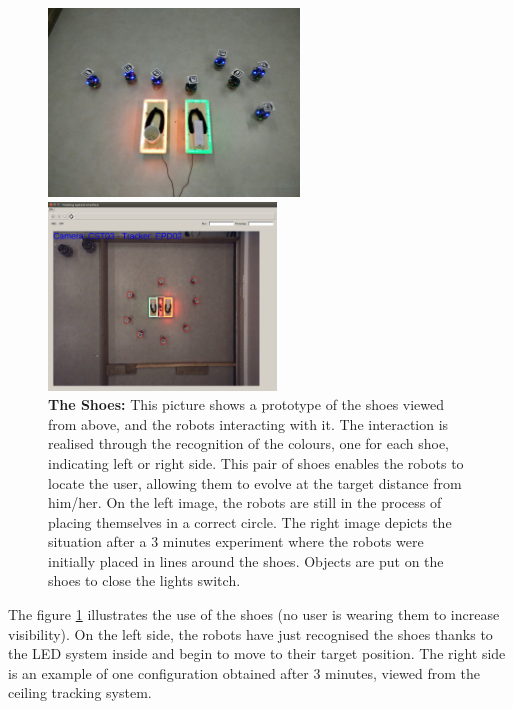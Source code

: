 \documentclass[oneside, a4paper, 12pt]{memoir}
\let\oldCaption\caption
\renewcommand{\caption}[2]{
\oldCaption[#1]{{\small\sffamily\bfseries #1:} #2}
}
\begin{document}
	\begin{figure}
		\begin{minipage}[c]{0.6\textwidth}
			\includegraphics[trim=200px 300px 140px 300px, clip=true, height=5cm]{images/shoes.jpg}
		\end{minipage}
		\hfill
		\begin{minipage}[c]{0.39\textwidth}
			\hfill\includegraphics[trim=380px 230px 380px 360px, clip=true, height=5cm]{../Experiments/No_Human/6end.png}
		\end{minipage}				
		
		\caption{The Shoes}{This picture shows a prototype of the shoes viewed from above, and the robots interacting with it. The interaction is realised through the recognition of the colours, one for each shoe, indicating left or right side. This pair of shoes enables the robots to locate the user, allowing them to evolve at the target distance from him/her. On the left image, the robots are still in the process of placing themselves in a correct circle. The right image depicts the situation after a 3 minutes experiment where the robots were initially placed in lines around the shoes. Objects are put on the shoes to close the lights switch.}
		\label{fig:shoes}
	\end{figure}

The figure \ref{fig:shoes} illustrates the use of the shoes (no user is wearing them to increase visibility). On the left side, the robots have just recognised the shoes thanks to the LED system inside and begin to move to their target position. The right side is an example of one configuration obtained after 3 minutes, viewed from the ceiling tracking system.\\
\end{document}
